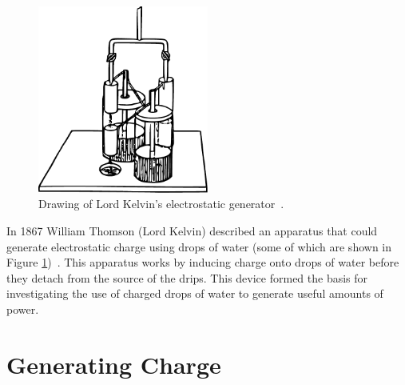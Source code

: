 \begin{figure}
    \centering
    \includegraphics[width=0.5\textwidth]{content/appendices/chargedWaterDrops/graphics/Figure_Drawing_KelvinWaterDripper_OriginalDevice}
    \caption{Drawing of Lord Kelvin's electrostatic generator~\cite{Thomson1867a}.}
    \label{Figure_Drawing_KelvinWaterDripper_OriginalDevice}
\end{figure}
In 1867 William Thomson (Lord Kelvin) described an apparatus that could generate electrostatic charge using drops of water (some of
which are shown in Figure \ref{Figure_Drawing_KelvinWaterDripper_OriginalDevice})~\cite{Thomson1867}.
This apparatus works by inducing charge onto drops of water before they detach from the source of the drips.
This device formed the basis for investigating the use of charged drops of water to generate useful amounts of power.


\section{Generating Charge}


